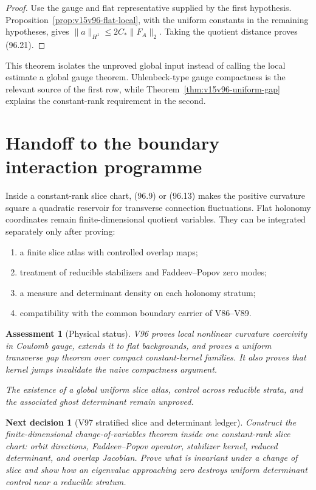\documentclass[11pt]{article}
\newtheorem{decision}[theorem]{Next decision}
\newtheorem{assessment}[theorem]{Assessment}
\theoremstyle{remark}
\begin{document}
\begin{proof}
Use the gauge and flat representative supplied by the first
hypothesis.  Proposition~\ref{prop:v15v96-flat-local}, with the
uniform constants in the remaining hypotheses, gives
\(\|a\|_{H^1}\leq2C_*\|F_A\|_2\).  Taking the quotient distance
proves (96.21).
\end{proof}

This theorem isolates the unproved global input instead of calling
the local estimate a global gauge theorem.  Uhlenbeck-type gauge
compactness is the relevant source of the first row, while
Theorem~\ref{thm:v15v96-uniform-gap} explains the constant-rank
requirement in the second.

\section{Handoff to the boundary interaction programme}

Inside a constant-rank slice chart, (96.9) or (96.13) makes the
positive curvature square a quadratic reservoir for transverse
connection fluctuations.  Flat holonomy coordinates remain
finite-dimensional quotient variables.  They can be integrated
separately only after proving:
\begin{enumerate}
\item a finite slice atlas with controlled overlap maps;
\item treatment of reducible stabilizers and Faddeev--Popov zero
      modes;
\item a measure and determinant density on each holonomy stratum;
\item compatibility with the common boundary carrier of V86--V89.
\end{enumerate}

\begin{assessment}[Physical status]
\label{ass:v15v96-status}
V96 proves local nonlinear curvature coercivity in Coulomb gauge,
extends it to flat backgrounds, and proves a uniform transverse
gap theorem over compact constant-kernel families.  It also proves
that kernel jumps invalidate the naive compactness argument.

The existence of a global uniform slice atlas, control across
reducible strata, and the associated ghost determinant remain
unproved.
\end{assessment}

\begin{decision}[V97 stratified slice and determinant ledger]
\label{dec:v15v96-next}
Construct the finite-dimensional change-of-variables theorem inside
one constant-rank slice chart: orbit directions, Faddeev--Popov
operator, stabilizer kernel, reduced determinant, and overlap
Jacobian.  Prove what is invariant under a change of slice and show
how an eigenvalue approaching zero destroys uniform determinant
control near a reducible stratum.
\end{decision}
\end{document}
